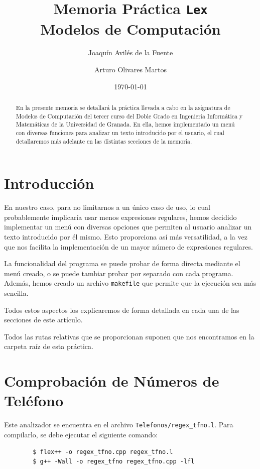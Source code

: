 \documentclass[12pt]{article}
\author{Joaquín Avilés de la Fuente \and Arturo Olivares Martos}
\date{\today}
\title{Memoria Práctica \texttt{Lex}\\Modelos de Computación}
\begin{document}
    

    \maketitle
    \tableofcontents

    \begin{abstract}
        En la presente memoria se detallará la práctica llevada a cabo en la asignatura de Modelos de Computación del tercer curso del Doble Grado en Ingeniería Informática y Matemáticas de la Universidad de Granada.
        En ella, hemos implementado un menú con diversas funciones para analizar un texto introducido por el usuario, el cual detallaremos más adelante en las distintas secciones de la memoria.
    \end{abstract}

    \newpage
    \section{Introducción}

    En nuestro caso, para no limitarnos a un único caso de uso, lo cual probablemente implicaría usar menos expresiones regulares, hemos decidido implementar un menú con diversas opciones que permiten al usuario analizar un texto introducido por él mismo. Esto proporciona así más versatilidad, a la vez que nos facilita la implementación de un mayor número de expresiones regulares.

    La funcionalidad del programa se puede probar de forma directa mediante el menú creado, o se puede tambiar probar por separado con cada programa. Además, hemos creado un archivo \verb|makefile| que permite que la ejecución sea más sencilla.

    Todos estos aspectos los explicaremos de forma detallada en cada una de las secciones de este artículo.

    \begin{observacion}
    Todos las rutas relativas que se proporcionan suponen que nos encontramos en la carpeta raíz de esta práctica.
    \end{observacion}

    \section{Comprobación de Números de Teléfono}

    Este analizador se encuentra en el archivo \verb|Telefonos/regex_tfno.l|. Para compilarlo, se debe ejecutar el siguiente comando:
    \begin{verbatim}
        $ flex++ -o regex_tfno.cpp regex_tfno.l
        $ g++ -Wall -o regex_tfno regex_tfno.cpp -lfl
    \end{verbatim}
\end{document}
